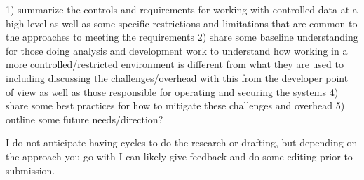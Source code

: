 \documentclass{amia}
\begin{document}
1) summarize the controls and requirements for working with controlled data at a high level as well as some specific restrictions and limitations that are common to the approaches to meeting the requirements
2) share some baseline understanding for those doing analysis and development work to understand how working in a more controlled/restricted environment is different from what they are used to including discussing the challenges/overhead with this from the developer point of view as well as those responsible for operating and securing the systems
4) share some best practices for how to mitigate these challenges and overhead
5) outline some future needs/direction?
 
I do not anticipate having cycles to do the research or drafting, but depending on the approach you go with I can likely give feedback and do some editing prior to submission.
\end{document}
